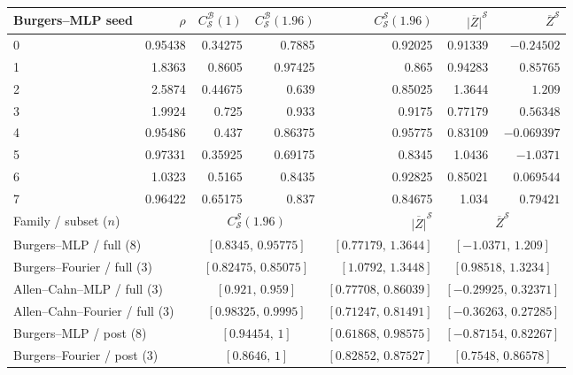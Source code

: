 \begin{table}[!htbp]
\centering\small\setlength{\tabcolsep}{4pt}
\begin{tabular}{@{}lrrrrrr@{}}
\toprule
Burgers--MLP seed & $\rho$ & $C^{\mathcal B}_{\mathcal S}(1)$ & $C^{\mathcal B}_{\mathcal S}(1.96)$ & $C^{\mathcal S}_{\mathcal S}(1.96)$ & $\overline{|Z|}^{\mathcal S}$ & $\overline Z^{\mathcal S}$\\
\midrule
0 & 0.95438 & 0.34275 & 0.7885 & 0.92025 & 0.91339 & $-0.24502$ \\
1 & 1.8363 & 0.8605 & 0.97425 & 0.865 & 0.94283 & $0.85765$ \\
2 & 2.5874 & 0.44675 & 0.639 & 0.85025 & 1.3644 & $1.209$ \\
3 & 1.9924 & 0.725 & 0.933 & 0.9175 & 0.77179 & $0.56348$ \\
4 & 0.95486 & 0.437 & 0.86375 & 0.95775 & 0.83109 & $-0.069397$ \\
5 & 0.97331 & 0.35925 & 0.69175 & 0.8345 & 1.0436 & $-1.0371$ \\
6 & 1.0323 & 0.5165 & 0.8435 & 0.92825 & 0.85021 & $0.069544$ \\
7 & 0.96422 & 0.65175 & 0.837 & 0.84675 & 1.034 & $0.79421$ \\
\midrule
\multicolumn{2}{l}{Family / subset ($n$)} & \multicolumn{2}{c}{$C^{\mathcal S}_{\mathcal S}(1.96)$} & $\overline{|Z|}^{\mathcal S}$ & \multicolumn{2}{c}{$\overline Z^{\mathcal S}$}\\
\midrule
\multicolumn{2}{l}{Burgers--MLP / full ($8$)} & \multicolumn{2}{c}{$[0.8345,\,0.95775]$} & $[0.77179,\,1.3644]$ & \multicolumn{2}{c}{$[-1.0371,\,1.209]$} \\
\multicolumn{2}{l}{Burgers--Fourier / full ($3$)} & \multicolumn{2}{c}{$[0.82475,\,0.85075]$} & $[1.0792,\,1.3448]$ & \multicolumn{2}{c}{$[0.98518,\,1.3234]$} \\
\multicolumn{2}{l}{Allen--Cahn--MLP / full ($3$)} & \multicolumn{2}{c}{$[0.921,\,0.959]$} & $[0.77708,\,0.86039]$ & \multicolumn{2}{c}{$[-0.29925,\,0.32371]$} \\
\multicolumn{2}{l}{Allen--Cahn--Fourier / full ($3$)} & \multicolumn{2}{c}{$[0.98325,\,0.9995]$} & $[0.71247,\,0.81491]$ & \multicolumn{2}{c}{$[-0.36263,\,0.27285]$} \\
\multicolumn{2}{l}{Burgers--MLP / post ($8$)} & \multicolumn{2}{c}{$[0.94454,\,1]$} & $[0.61868,\,0.98575]$ & \multicolumn{2}{c}{$[-0.87154,\,0.82267]$} \\
\multicolumn{2}{l}{Burgers--Fourier / post ($3$)} & \multicolumn{2}{c}{$[0.8646,\,1]$} & $[0.82852,\,0.87527]$ & \multicolumn{2}{c}{$[0.7548,\,0.86578]$} \\

\end{tabular}
\end{table}
